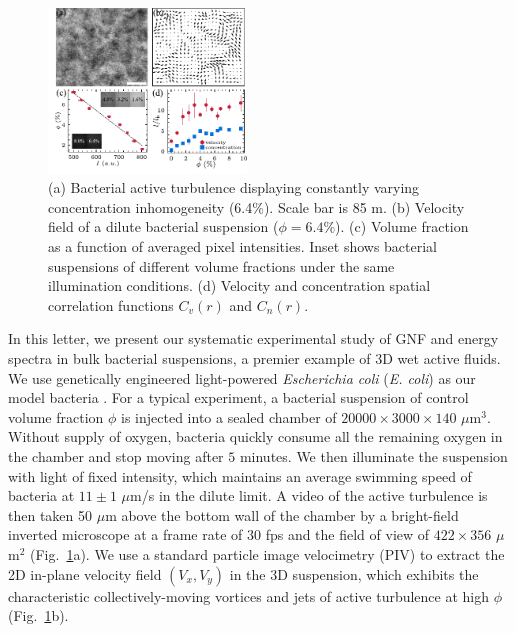 \documentclass[twocolumn,aps,prl,amsmath,amssymb,longbibliography]{revtex4-2}
\begin{document}



\begin{figure}[ht]
\begin{center}
\includegraphics[width=0.47\textwidth]{Figures/experiment/v1.pdf}
\caption[Experimental details]
{
(a) Bacterial active turbulence displaying constantly varying concentration inhomogeneity (6.4\%). Scale bar is 85 \textmu m.
(b) Velocity field of a dilute bacterial suspension ($\phi=6.4\%$).
(c) Volume fraction as a function of averaged pixel intensities. Inset shows bacterial suspensions of different volume fractions under the same illumination conditions.
(d) Velocity and concentration spatial correlation functions $C_{v}(r)$ and $C_{n}(r)$.
}
\label{fig:experiment}
\end{center}
\end{figure}

In this letter, we present our systematic experimental study of GNF and energy spectra in bulk bacterial suspensions, a premier example of 3D wet active fluids. We use genetically engineered light-powered \textit{Escherichia coli} (\textit{E. coli}) as our model bacteria \cite{Liu2020}.
For a typical experiment, a bacterial suspension of control volume fraction $\phi$ is injected into a sealed chamber of $20000 \times 3000 \times 140$ $\mu$m$^3$.
Without supply of oxygen, bacteria quickly consume all the remaining oxygen in the chamber and stop moving after $5$ minutes.
We then illuminate the suspension with light
of fixed intensity, which maintains an average swimming speed of bacteria at $11 \pm 1$ $\mu$m/s in the dilute limit.
A video of the active turbulence is then taken 50 $\mu$m above the bottom wall of the chamber by a bright-field inverted microscope at a frame rate of $30$ fps and the field of view of $422 \times 356$ $\mu$m$^2$ (Fig.~\ref{fig:experiment}a).
We use a standard particle image velocimetry (PIV) to extract the 2D in-plane velocity field $(V_x,V_y)$ in the 3D suspension, which exhibits the characteristic collectively-moving vortices and jets of active turbulence at high $\phi$ (Fig.~\ref{fig:experiment}b).
\end{document}
